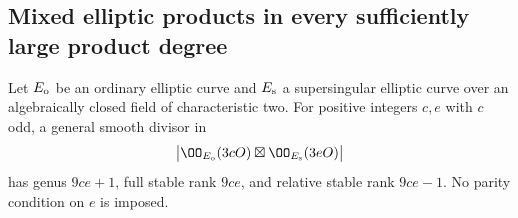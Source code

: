 \subsection{Mixed elliptic products in every sufficiently large product degree}
\label{sec:DE-A3-mixed-all-products}

\begin{lemma}
\label{lem:DE-A3-mixed-odd-factor}
Let $E_{\rm o}$ be an ordinary elliptic curve and $E_{\rm s}$ a
supersingular elliptic curve over an algebraically closed field of
characteristic two.  For positive integers $c,e$ with $c$ odd, a
general smooth divisor in
\[
 \bigl|\OO_{E_{\rm o}}(3cO)\boxtimes\OO_{E_{\rm s}}(3eO)\bigr|
\]
has genus $9ce+1$, full stable rank $9ce$, and relative stable rank
$9ce-1$.  No parity condition on $e$ is imposed.
\end{lemma}

